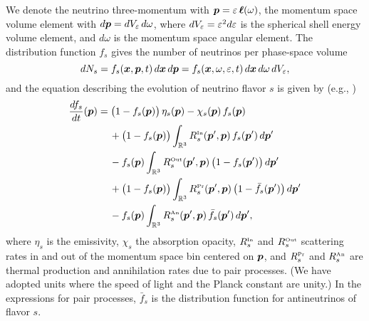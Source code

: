 \documentclass[12pt]{article}
\newcommand{\IN}{\mbox{\tiny In}}
\newcommand{\OUT}{\mbox{\tiny Out}}
\newcommand{\PROD}{\mbox{\tiny Pr}}
\newcommand{\ANN}{\mbox{\tiny An}}
\begin{document}
We denote the neutrino three-momentum with $\boldsymbol{p}=\varepsilon\,\boldsymbol{\ell}(\omega)$, the momentum space volume element with $d\boldsymbol{p}=dV_{\varepsilon}\,d\omega$, where $dV_{\varepsilon}=\varepsilon^{2}d\varepsilon$ is the spherical shell energy volume element, and $d\omega$ is the momentum space angular element.  
The distribution function $f_{s}$ gives the number of neutrinos per phase-space volume
\begin{equation}
  dN_{s}=f_{s}(\boldsymbol{x},\boldsymbol{p},t)\,d\boldsymbol{x}\,d\boldsymbol{p}
  =f_{s}(\boldsymbol{x},\omega,\varepsilon,t)\,d\boldsymbol{x}\,d\omega\,dV_{\varepsilon},
\end{equation}
and the equation describing the evolution of neutrino flavor $s$ is given by (e.g., \citep{bruenn_1985})
\begin{align}
  \deriv{f_{s}}{t}(\vect{p})
  & = \big(1-f_{s}(\vect{p})\big)\,\eta_{s}(\vect{p}) - \chi_{s}(\vect{p})\,f_{s}(\vect{p}) \nonumber \\
  & \hspace{12pt}
  +\big(1-f_{s}(\vect{p})\big)\int_{\bbR^{3}}R_{s}^{\IN}(\vect{p}',\vect{p})\,f_{s}(\vect{p}')\,d\vect{p}' \nonumber \\
  & \hspace{12pt}
  -f_{s}(\vect{p})\int_{\bbR^{3}}R_{s}^{\OUT}(\vect{p}',\vect{p})\,\big(1-f_{s}(\vect{p}')\big)\,d\vect{p}' \nonumber \\
  & \hspace{12pt}
  +\big(1-f_{s}(\vect{p})\big)\int_{\bbR^{3}}R_{s}^{\PROD}(\vect{p}',\vect{p})\,\big(1-\bar{f}_{s}(\vect{p}')\big)\,d\vect{p}' \nonumber \\
  & \hspace{12pt}
  -f_{s}(\vect{p})\int_{\bbR^{3}}R_{s}^{\ANN}(\vect{p}',\vect{p})\,\bar{f}_{s}(\vect{p}')\,d\vect{p}',
  \label{eq:homogeneousBoltzmann}
\end{align}
where $\eta_{s}$ is the emissivity, $\chi_{s}$ the absorption opacity, $R_{s}^{\IN}$ and $R_{s}^{\OUT}$ scattering rates in and out of the momentum space bin centered on $\boldsymbol{p}$, and $R_{s}^{\PROD}$ and $R_{s}^{\ANN}$ are thermal production and annihilation rates due to pair processes.  
(We have adopted units where the speed of light and the Planck constant are unity.)  
In the expressions for pair processes, $\bar{f}_{s}$ is the distribution function for antineutrinos of flavor $s$.  
\end{document}
